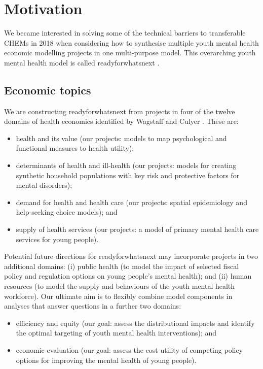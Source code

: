 \documentclass[sn-vancouver,Numbered,pdflatex]{sn-jnl}
\theoremstyle{remark}
\theoremstyle{definition}
\begin{document}
\hypertarget{motivation}{%
\section{Motivation}\label{motivation}}

We became interested in solving some of the technical barriers to transferable CHEMs in 2018 when considering how to synthesise multiple youth mental health economic modelling projects in one multi-purpose model. This overarching youth mental health model is called readyforwhatsnext \citep{rfwn2024}.

\hypertarget{economic-topics}{%
\subsection{Economic topics}\label{economic-topics}}

We are constructing readyforwhatsnext from projects in four of the twelve domains of health economics identified by Wagstaff and Culyer \citep{wagstaff2012four}. These are:

\begin{itemize}
\item
  health and its value (our projects: models to map psychological and functional measures to health utility);
\item
  determinants of health and ill-health (our projects: models for creating synthetic household populations with key risk and protective factors for mental disorders);
\item
  demand for health and health care (our projects: spatial epidemiology and help-seeking choice models); and
\item
  supply of health services (our projects: a model of primary mental health care services for young people).
\end{itemize}

Potential future directions for readyforwhatsnext may incorporate projects in two additional domains: (i) public health (to model the impact of selected fiscal policy and regulation options on young people's mental health); and (ii) human resources (to model the supply and behaviours of the youth mental health workforce). Our ultimate aim is to flexibly combine model components in analyses that answer questions in a further two domains:

\begin{itemize}
\item
  efficiency and equity (our goal: assess the distributional impacts and identify the optimal targeting of youth mental health interventions); and
\item
  economic evaluation (our goal: assess the cost-utility of competing policy options for improving the mental health of young people).
\end{itemize}
\end{document}
